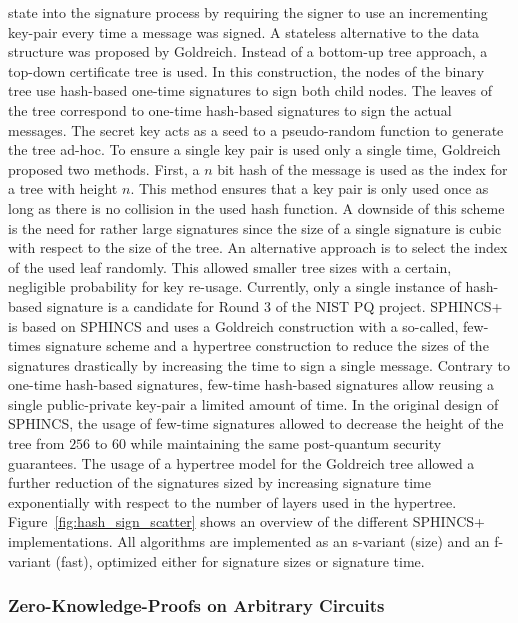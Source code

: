 state into the signature process by requiring the signer to use an incrementing key-pair every time a message was signed. A stateless alternative to the data structure was proposed by Goldreich. Instead of a bottom-up tree approach, a top-down certificate tree is used. In this construction, the nodes of the binary tree use hash-based one-time signatures to sign both child nodes. The leaves of the tree correspond to one-time hash-based signatures to sign the actual messages. The secret key acts as a seed to a pseudo-random function to generate the tree ad-hoc. To ensure a single key pair is used only a single time, Goldreich proposed two methods. First, a \(n\) bit hash of the message is used as the index for a tree with height \(n\). This method ensures that a key pair is only used once as long as there is no collision in the used hash function. A downside of this scheme is the need for rather large signatures since the size of a single signature is cubic with respect to the size of the tree. An alternative approach is to select the index of the used leaf randomly. This allowed smaller tree sizes with a certain, negligible probability for key re-usage\cite{bernstein2015sphincs}. Currently, only a single instance of hash-based signature is a candidate for Round 3 of the \ac{NIST} \ac{PQ} project. SPHINCS+ is based on SPHINCS and uses a Goldreich construction with a so-called, few-times signature scheme and a hypertree construction to reduce the sizes of the signatures drastically by increasing the time to sign a single message. Contrary to one-time hash-based signatures, few-time hash-based signatures allow reusing a single public-private key-pair a limited amount of time. In the original design of SPHINCS, the usage of few-time signatures allowed to decrease the height of the tree from \(256\) to \(60\) while maintaining the same post-quantum security guarantees\cite{bernstein2015sphincs}. The usage of a hypertree model for the Goldreich tree allowed a further reduction of the signatures sized by increasing signature time exponentially with respect to the number of layers used in the hypertree. Figure~\ref{fig:hash_sign_scatter} shows an overview of the different SPHINCS+ implementations. All algorithms are implemented as an s-variant (size) and an f-variant (fast), optimized either for signature sizes or signature time.

\subsubsection{Zero-Knowledge-Proofs on Arbitrary Circuits}

